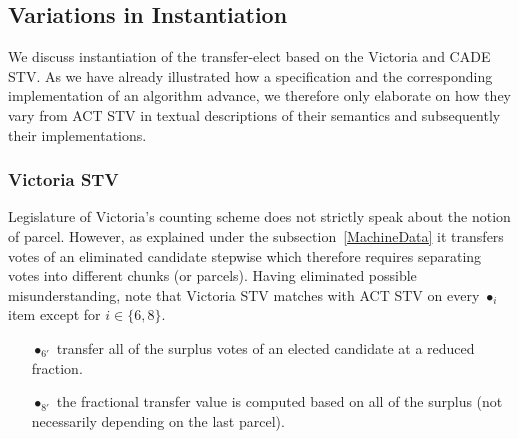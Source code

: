 \documentclass[10pt,conference]{IEEEtran}
\begin{document}
\subsection{Variations in Instantiation}
We discuss instantiation of the transfer-elect  based on the Victoria and CADE STV. As we have already illustrated how a specification and the corresponding implementation of an algorithm advance, we therefore only elaborate on how they vary from ACT STV in textual descriptions of their semantics and subsequently their implementations. 
\subsubsection{Victoria STV}
Legislature of Victoria's counting scheme does not strictly speak about the notion of parcel. However, as explained under the subsection~\ref{MachineData} it transfers votes of an eliminated candidate stepwise which therefore requires separating votes into different chunks (or parcels). Having eliminated possible misunderstanding, note that Victoria STV matches with ACT STV  on every $\bullet_{i}$ item except for $i\in\{6,8\}$.
\begin{itemize}
\item[$\bullet_{6'}$] transfer all of the surplus votes of an elected candidate at a reduced fraction.
\item[$\bullet_{8'}$] the fractional transfer value is computed based on all of the surplus (not necessarily depending on the last parcel).
\end{itemize} 
\end{document}
